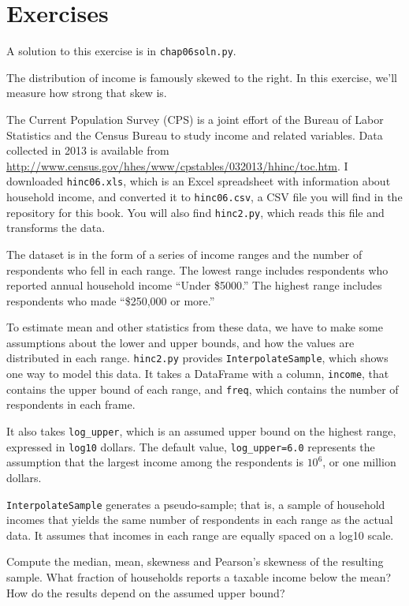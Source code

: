 \section{Exercises}

A solution to this exercise is in \verb"chap06soln.py".

\begin{exercise}

The distribution of income is famously skewed to the right.  In this
exercise, we'll measure how strong that skew is.

The Current Population Survey (CPS) is a joint effort of the Bureau
of Labor Statistics and the Census Bureau to study income and related
variables.  Data collected in 2013 is available from
\url{http://www.census.gov/hhes/www/cpstables/032013/hhinc/toc.htm}.
I downloaded {\tt hinc06.xls}, which is an Excel spreadsheet with
information about household income, and converted it to {\tt hinc06.csv},
a CSV file you will find in the repository for this book.  You
will also find {\tt hinc2.py}, which reads this file and transforms
the data.

The dataset is in the form of a series of income ranges and the number
of respondents who fell in each range.  The lowest range includes
respondents who reported annual household income ``Under \$5000.''
The highest range includes respondents who made ``\$250,000 or
more.''

To estimate mean and other statistics from these data, we have to
make some assumptions about the lower and upper bounds, and how
the values are distributed in each range.  {\tt hinc2.py} provides
{\tt InterpolateSample}, which shows one way to model
this data.  It takes a DataFrame with a column, {\tt income}, that
contains the upper bound of each range, and {\tt freq}, which contains
the number of respondents in each frame.

It also takes \verb"log_upper", which is an assumed upper bound
on the highest range, expressed in {\tt log10} dollars.  
The default value, \verb"log_upper=6.0" represents the assumption
that the largest income among the respondents is
$10^6$, or one million dollars.

{\tt InterpolateSample} generates a pseudo-sample; that is, a sample
of household incomes that yields the same number of respondents
in each range as the actual data.  It assumes that incomes in
each range are equally spaced on a log10 scale.

Compute the median, mean, skewness and Pearson's skewness of the
resulting sample.  What fraction of households reports a taxable
income below the mean?  How do the results depend on the assumed
upper bound?
\end{exercise}


